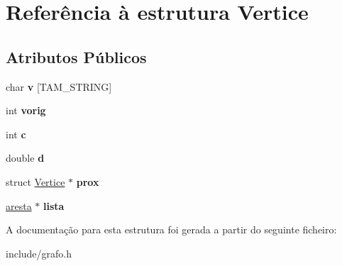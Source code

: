 \hypertarget{structVertice}{\section{Referência à estrutura Vertice}
\label{structVertice}
}
\subsection*{Atributos Públicos}
\begin{DoxyCompactItemize}
\item 
\hypertarget{structVertice_a56fbf76b75da722a679b5e40eb5b307f}{char {\bfseries v} \mbox{[}T\-A\-M\-\_\-\-S\-T\-R\-I\-N\-G\mbox{]}}\label{structVertice_a56fbf76b75da722a679b5e40eb5b307f}

\item 
\hypertarget{structVertice_a371983eb0de335463257ab8d2d44d1df}{int {\bfseries vorig}}\label{structVertice_a371983eb0de335463257ab8d2d44d1df}

\item 
\hypertarget{structVertice_ad28326e13d8ef517dc380da0093db8a8}{int {\bfseries c}}\label{structVertice_ad28326e13d8ef517dc380da0093db8a8}

\item 
\hypertarget{structVertice_ac9083b79fc82a9e91d7510045f73b240}{double {\bfseries d}}\label{structVertice_ac9083b79fc82a9e91d7510045f73b240}

\item 
\hypertarget{structVertice_af23ae50f1a9230531a4f4507eb457a4e}{struct \hyperlink{structVertice}{Vertice} $\ast$ {\bfseries prox}}\label{structVertice_af23ae50f1a9230531a4f4507eb457a4e}

\item 
\hypertarget{structVertice_aea3062274f568286cb092900ad665faa}{\hyperlink{structAresta}{aresta} $\ast$ {\bfseries lista}}\label{structVertice_aea3062274f568286cb092900ad665faa}

\end{DoxyCompactItemize}


A documentação para esta estrutura foi gerada a partir do seguinte ficheiro\-:\begin{DoxyCompactItemize}
\item 
include/grafo.\-h\end{DoxyCompactItemize}
